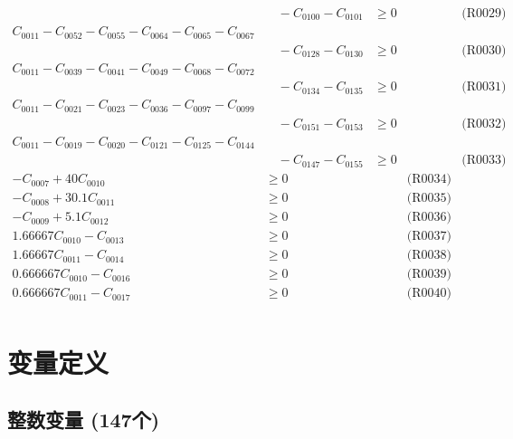 \documentclass[a4paper,10pt]{article}
\begin{document}
{\begin{align}
&\quad  - C_{0100} - C_{0101} &\geq 0 && \text{(R0029)} \\
C_{0011} - C_{0052} - C_{0055} - C_{0064} - C_{0065} - C_{0067} \\[0.5ex]
&\quad  - C_{0128} - C_{0130} &\geq 0 && \text{(R0030)} \\
C_{0011} - C_{0039} - C_{0041} - C_{0049} - C_{0068} - C_{0072} \\[0.5ex]
&\quad  - C_{0134} - C_{0135} &\geq 0 && \text{(R0031)} \\
C_{0011} - C_{0021} - C_{0023} - C_{0036} - C_{0097} - C_{0099} \\[0.5ex]
&\quad  - C_{0151} - C_{0153} &\geq 0 && \text{(R0032)} \\
C_{0011} - C_{0019} - C_{0020} - C_{0121} - C_{0125} - C_{0144} \\[0.5ex]
&\quad  - C_{0147} - C_{0155} &\geq 0 && \text{(R0033)} \\
-C_{0007} + 40C_{0010} &\geq 0 && \text{(R0034)} \\
-C_{0008} + 30.1C_{0011} &\geq 0 && \text{(R0035)} \\
-C_{0009} + 5.1C_{0012} &\geq 0 && \text{(R0036)} \\
1.66667C_{0010} - C_{0013} &\geq 0 && \text{(R0037)} \\
1.66667C_{0011} - C_{0014} &\geq 0 && \text{(R0038)} \\
\allowbreak
0.666667C_{0010} - C_{0016} &\geq 0 && \text{(R0039)} \\
0.666667C_{0011} - C_{0017} &\geq 0 && \text{(R0040)} \\
\end{align}}

\section{变量定义}

\subsection{整数变量 (147个)}
\end{document}
